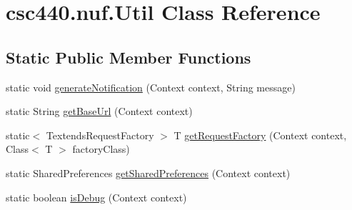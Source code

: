 \hypertarget{classcsc440_1_1nuf_1_1_util}{\section{csc440.\-nuf.\-Util Class Reference}
\label{classcsc440_1_1nuf_1_1_util}
}
\subsection*{Static Public Member Functions}
\begin{DoxyCompactItemize}
\item 
static void \hyperlink{classcsc440_1_1nuf_1_1_util_adbbee48d176f30c61d5819634d17b73a}{generate\-Notification} (Context context, String message)
\item 
static String \hyperlink{classcsc440_1_1nuf_1_1_util_a6073587e3dc087b21d85869abe1e91e9}{get\-Base\-Url} (Context context)
\item 
static$<$ Textends\-Request\-Factory $>$ T \hyperlink{classcsc440_1_1nuf_1_1_util_a5fbb65d6db8c6c778abe34f22b529513}{get\-Request\-Factory} (Context context, Class$<$ T $>$ factory\-Class)
\item 
static Shared\-Preferences \hyperlink{classcsc440_1_1nuf_1_1_util_a048158fe7160473100aaae303ef393e4}{get\-Shared\-Preferences} (Context context)
\item 
static boolean \hyperlink{classcsc440_1_1nuf_1_1_util_ab50759c63c640488621224b197658775}{is\-Debug} (Context context)
\end{DoxyCompactItemize}
